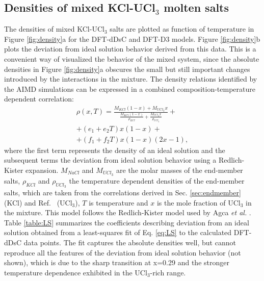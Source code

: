 \documentclass[preprint,3p,10pt,twocolumn,number,sort&compress]{elsarticle}
\begin{document}
\subsection{Densities of mixed KCl-UCl$_3$ molten salts}
The densities of mixed KCl-UCl$_3$ salts are plotted as function of temperature in Figure \ref{fig:density}a for the DFT-dDsC and DFT-D3 models. Figure \ref{fig:density}b plots the deviation from ideal solution behavior derived from this data. This is a convenient way of visualized the behavior of the mixed system, since the absolute densities in Figure \ref{fig:density}a obscures the small but still important changes introduced by the interactions in the mixture. The density relations identified by the AIMD simulations can be expressed in a combined composition-temperature dependent correlation:
\begin{equation}
\begin{split}
\rho(x,T)=\frac{M_{KCl}(1-x)+M_{UCl_3}x}{\frac{M_{KCl}(1-x)}{\rho_{KCl}}+\frac{M_{UCl_3}x}{\rho_{UCl_3}}}+ \\
+(e_1+e_2T)x(1-x)+\\
+(f_1+f_2T)x(1-x)(2x-1), 
\label{eq:LS}
\end{split}
\end{equation}
\noindent where the first term represents the density of an ideal solution and the subsequent terms the deviation from ideal solution behavior using a Redlich-Kister expansion. $M_{NaCl}$ and $M_{UCl_3}$ are the molar masses of the end-member salts, $\rho_{KCl}$ and $\rho_{UCl_3}$ the temperature dependent densities of the end-member salts, which are taken from the correlations derived in Sec. \ref{sec:endmember} (KCl) and Ref.~\cite{Andersson} (UCl$_3$), $T$ is temperature and $x$ is the mole fraction of UCl$_3$ in the mixture. This model follows the Redlich-Kister model used by Agca \textit{et al.} \cite{agca2022}. Table \ref{table:LS} summarizes the coefficients describing deviation from an ideal solution obtained from a least-squares fit of Eq. \ref{eq:LS} to the calculated DFT-dDsC data points. 
The fit captures the absolute densities well, but cannot reproduce all the features of the deviation from ideal solution behavior (not shown), which is due to the sharp transition at x=0.29 and the stronger temperature dependence exhibited in the UCl$_3$-rich range.
\end{document}
